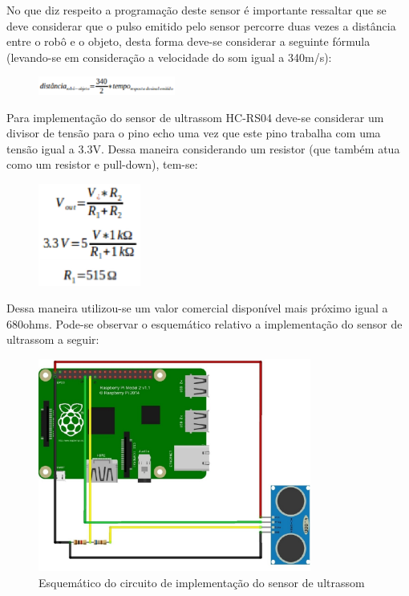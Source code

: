 No que diz respeito a programação deste sensor é importante ressaltar que se deve considerar que o pulso emitido pelo sensor percorre duas vezes a distância entre o robô e o objeto, desta forma deve-se considerar a seguinte fórmula (levando-se em consideração a velocidade do som igual a 340m/s):

\begin{figure}[H]
    \centering
    \includegraphics[width=0.4\textwidth]{figuras/distancia.eps}
    \caption{}
    \label{fig:catia01}
\end{figure}

Para implementação do sensor de ultrassom HC-RS04 deve-se considerar um divisor de tensão para o pino echo uma vez que este pino trabalha com uma tensão igual a 3.3V. Dessa maneira considerando um resistor  (que também atua como um resistor e pull-down), tem-se:

\begin{figure}[H]
    \centering
    \includegraphics[width=0.3\textwidth]{figuras/vout.eps}
    \caption{}
    \label{fig:catia01}
\end{figure}

Dessa maneira utilizou-se um valor comercial disponível mais próximo igual a 680ohms. Pode-se observar o esquemático relativo a implementação do sensor de ultrassom a seguir:

\begin{figure}[H]
    \centering
    \includegraphics[width=0.8\textwidth]{figuras/esquematico_ultrassom.eps}
    \caption{Esquemático do circuito de implementação do sensor de ultrassom}
    \label{fig:catia01}
\end{figure}

